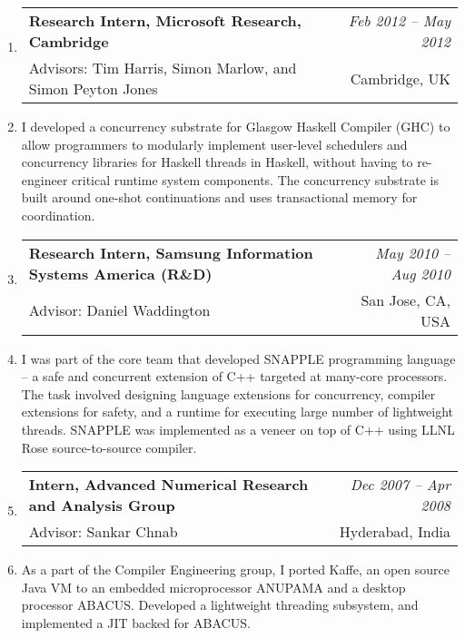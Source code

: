 \documentclass[10pt]{article}
\makeatletter
\newcommand{\lbar}[1]{{\color{#1}\ding{118}}\hspace*{2pt}}
\newenvironment{benumerate}[2]{
    \let\oldItem\item
    \def\item{\addtocounter{enumi}{-2}\oldItem}
    \begin{enumerate}[#2] \itemsep3pt
    \setcounter{enumi}{#1}
    \addtocounter{enumi}{1}}
  {\end{enumerate}}
\newenvironment{position}[5]
{%
\item
  \begin{tabular*}{7.5in}{l@{\extracolsep{\fill}}r}
    \textbf{#1} & \textit{#2} \\
    \hspace{1ex} #3 & \small{#4} \\
  \end{tabular*}
\item \hspace{1ex} \parbox{7.3in}{\hspace{4ex}#5}
  }
  { %
}
\newenvironment{region}[3]{%
  \vspace*{0.5ex}
  {\scalebox{1.4}{\textbf{#1}}}
  \begin{benumerate}{#3}{\color{RoyalBlue}#2}}
  {\end{benumerate}\vspace{0.8ex}}
\newenvironment{nonumregion}[1]{%
\begin{region}{#1}{}{1}}
{\end{region}}
\makeatother
\begin{document}
\begin{nonumregion} {\lbar{orange}Experience}
  \begin{position}{Research Intern, Microsoft Research, Cambridge}{Feb 2012 -- May 2012}
    {Advisors: Tim Harris, Simon Marlow, and Simon Peyton Jones}{Cambridge, UK}
    {I developed a concurrency substrate for Glasgow Haskell Compiler (GHC) to
    allow programmers to modularly implement user-level schedulers and
    concurrency libraries for Haskell threads in Haskell, without having to
    re-engineer critical runtime system components. The concurrency substrate
    is built around one-shot continuations and uses transactional memory for
    coordination.}
  \end{position}

  \begin{position}{Research Intern, Samsung Information Systems America (R\&D)}{May 2010 -- Aug 2010}
    {Advisor: Daniel Waddington}{San Jose, CA, USA}
    {I was part of the core team that developed SNAPPLE programming language --
    a safe and concurrent extension of C++ targeted at many-core processors.
    The task involved designing language extensions for concurrency, compiler
    extensions for safety, and a runtime for executing large number of
    lightweight threads. SNAPPLE was implemented as a veneer on top of C++
    using LLNL Rose source-to-source compiler.}
  \end{position}

  \begin{position}{Intern, Advanced Numerical Research and Analysis Group}{Dec 2007 -- Apr 2008}
    {Advisor: Sankar Chnab}{Hyderabad, India}
    {As a part of the Compiler Engineering group, I ported Kaffe, an open
    source Java VM to an embedded microprocessor ANUPAMA and a desktop
    processor ABACUS. Developed a lightweight threading subsystem, and
    implemented a JIT backed for ABACUS.}
  \end{position}
\end{nonumregion}
\end{document}
